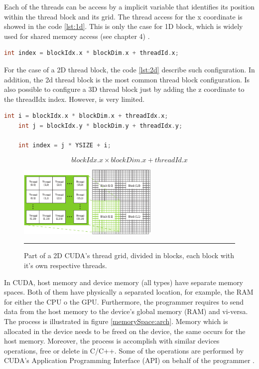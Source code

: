 Each of the threads can be access by a implicit variable that identifies its position within the thread block and its grid. The thread access for the x coordinate is showed in the code \ref{lst:1d}. This is only the case for 1D block, which is widely used for shared memory access (see chapter 4) \cite{example}.

\begin{lstlisting}[language=C++, label={lst:1d}, caption={1D block}]	
	int index = blockIdx.x * blockDim.x + threadId.x;
\end{lstlisting}

For the case of a 2D thread block, the code \ref{lst:2d} describe such configuration. In addition, the 2d thread block is the most common thread block configuration. Is also possible to configure a 3D thread block just by adding the z coordinate to the threadIdx index. However, is very limited.

\begin{lstlisting}[language=C++, label={lst:2d}, caption={2D block}]	
    int i = blockIdx.x * blockDim.x + threadIdx.x;
    int j = blockIdx.y * blockDim.y + threadIdx.y;
    
    int index = j * YSIZE + i;
\end{lstlisting}

$$blockIdx.x \times blockDim.x + threadId.x$$

\begin{figure}[htbp]
	\centering
		\includegraphics[width=0.6\textwidth]{Figures/grid.png}
		\rule{35em}{0.5pt}
	\caption[Part of the CUDA's 2D grid]{Part of a 2D CUDA's thread grid, divided in blocks, each block with it’s own respective threads.}
	\label{fig:grid}
\end{figure}

In CUDA, host memory and device memory (all types) have separate memory spaces. Both of them have physically a separated location, for example, the RAM for either the CPU o the GPU. Furthermore, the programmer requires to send data from the host memory to the device's global memory (RAM) and vi-versa. The process is illustrated in figure \ref{memorySpace:arch}. Memory which is allocated in the device needs to be freed on the device, the same occurs for the host memory. Moreover, the process is accomplish with similar devices operations, free or delete in C/C++. Some of the operations are performed by CUDA's Application Programming Interface (API) on behalf of the programmer \cite{hwu}.

